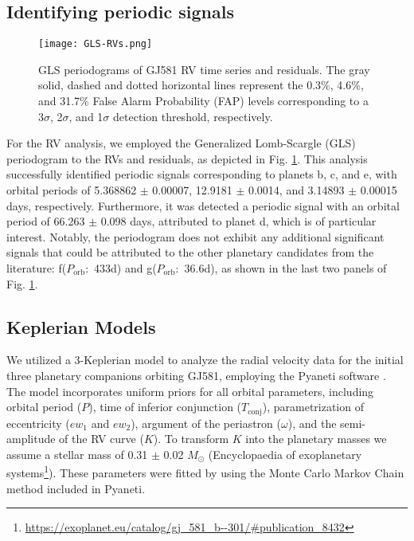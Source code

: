 \documentclass[baaa]{baaa}
\begin{document}
\subsection{Identifying periodic signals}
\begin{figure}[t]
    \centering
    \texttt{[image: GLS-RVs.png]}
    \caption{GLS periodograms of GJ581 RV time series and residuals. The gray solid, dashed and dotted horizontal lines represent the 0.3\%, 4.6\%, and 31.7\% False Alarm Probability (FAP) levels corresponding to a 3$\sigma$, 2$\sigma$, and 1$\sigma$ detection threshold, respectively.}
    \label{fig:gls}
\end{figure}

For the RV analysis, we employed the Generalized Lomb-Scargle (GLS) periodogram \citep{2009GLS} to the RVs and residuals, as depicted in Fig. \ref{fig:gls}. This analysis successfully identified periodic signals corresponding to planets b, c, and e, with orbital periods of 5.368862 $\pm$ 0.00007, 12.9181 $\pm$ 0.0014, and 3.14893 $\pm$ 0.00015 days, respectively. Furthermore, it was detected a periodic signal with an orbital period of 66.263 $\pm$ 0.098 days, attributed to planet d, which is of particular interest. Notably, the periodogram does not exhibit any additional significant signals that could be attributed to the other planetary candidates from the literature: f($P_{\mathrm{orb}}:$ 433d) and g($P_{\mathrm{orb}}:$ 36.6d), as shown in the last two panels of Fig. \ref{fig:gls}.

\subsection{Keplerian Models}

We utilized a 3-Keplerian model to analyze the radial velocity data for the initial three planetary companions orbiting GJ581, employing the {\sc Pyaneti} software \citep{2022pyanetiII}. The model incorporates uniform priors for all orbital parameters, including orbital period ($P$), time of inferior conjunction ($T_{\text{conj}}$), parametrization of eccentricity ($ew_1$ and $ew_2$), argument of the periastron ($\omega$), and the semi-amplitude of the RV curve ($K$). To transform $K$ into the planetary masses we assume a stellar mass of 0.31 $\pm$ 0.02 $M_\odot$ {(Encyclopaedia of exoplanetary systems\footnote{\url{https://exoplanet.eu/catalog/gj\_581\_b--301/\#publication\_8432}})}. These parameters were fitted by using the Monte Carlo Markov Chain method included in {\sc Pyaneti}.
\end{document}
